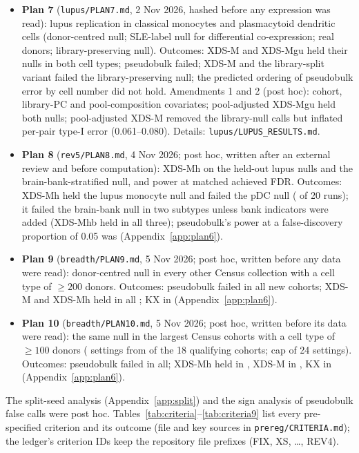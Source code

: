 \begin{itemize}
\item \textbf{Plan 7} (\texttt{lupus/PLAN7.md}, 2 Nov 2026, hashed before any expression was read): lupus replication in classical monocytes and plasmacytoid dendritic cells (donor-centred null; SLE-label null for differential co-expression; real donors; library-preserving null). Outcomes: XDS-M and XDS-Mgu held their nulls in both cell types; pseudobulk failed; XDS-M and the library-split variant failed the library-preserving null; the predicted ordering of pseudobulk error by cell number did not hold. Amendments 1 and 2 (post hoc): cohort, library-PC and pool-composition covariates; pool-adjusted XDS-Mgu held both nulls; pool-adjusted XDS-M removed the library-null calls but inflated per-pair type-I error (0.061--0.080). Details: \texttt{lupus/LUPUS\_RESULTS.md}.
\item \textbf{Plan 8} (\texttt{rev5/PLAN8.md}, 4 Nov 2026; post hoc, written after an external review and before computation): XDS-Mh on the held-out lupus nulls and the brain-bank-stratified null, and power at matched achieved FDR. Outcomes: XDS-Mh held the lupus monocyte null and failed the pDC null (\PeLAh{} of 20 runs); it failed the brain-bank null in two subtypes unless bank indicators were added (XDS-Mhb held in all three); pseudobulk's power at a false-discovery proportion of 0.05 was \PeMatchPB{} (Appendix~\ref{app:plan6}).
\item \textbf{Plan 9} (\texttt{breadth/PLAN9.md}, 5 Nov 2026; post hoc, written before any data were read): donor-centred null in every other Census collection with a cell type of $\ge200$ donors. Outcomes: pseudobulk failed in all \BrN{} new cohorts; XDS-M and XDS-Mh held in all \BrN; KX in \BrKXheld{} (Appendix~\ref{app:plan6}).
\item \textbf{Plan 10} (\texttt{breadth/PLAN10.md}, 5 Nov 2026; post hoc, written before its data were read): the same null in the largest Census cohorts with a cell type of $\ge100$ donors (\BtN{} settings from \BtColl{} of the 18 qualifying cohorts; cap of 24 settings). Outcomes: pseudobulk failed in all; XDS-Mh held in \BtHheld, XDS-M in \BtXheld, KX in \BtKXheld{} (Appendix~\ref{app:plan6}).
\end{itemize}
The split-seed analysis (Appendix~\ref{app:split}) and the sign analysis of pseudobulk false calls were post hoc. Tables~\ref{tab:criteria}--\ref{tab:criteria9} list every pre-specified criterion and its outcome (file and key sources in \texttt{prereg/CRITERIA.md}); the ledger's criterion IDs keep the repository file prefixes (FIX, XS, \ldots, REV4).

